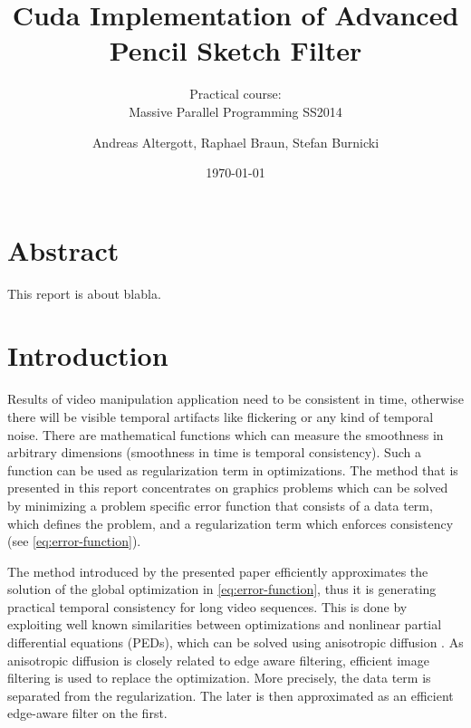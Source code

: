 \documentclass{utue} %
\title{Cuda Implementation of Advanced Pencil Sketch Filter}
\author{Andreas Altergott, Raphael Braun, Stefan Burnicki}
\date{\today}
\subtitle{Practical course:\\Massive Parallel Programming SS2014}
\begin{document}

\maketitle 
 
\section*{Abstract} 
This report is about blabla.

\section{Introduction}
Results of video manipulation application need to be consistent in time,
otherwise there will be visible temporal artifacts like flickering or any kind
of temporal noise. There are mathematical functions which can measure the
smoothness in arbitrary dimensions (smoothness in time is temporal consistency).
Such a function can be used as regularization term in optimizations. The method
that is presented in this report concentrates on graphics problems which can be
solved by minimizing a problem specific error function that consists of a data
term, which defines the problem, and a regularization term which enforces
consistency (see \autoref{eq:error-function}). 

The method introduced by the presented paper \cite{Lang:2012} efficiently
approximates the solution of the global optimization in
\autoref{eq:error-function}, thus it is generating practical temporal
consistency for long video sequences. This is done by exploiting well known
similarities between optimizations and nonlinear partial differential equations
(PEDs), which can be solved using anisotropic diffusion \cite{Weickert:1998}. As
anisotropic diffusion is closely related to edge aware filtering, efficient
image filtering is used to replace the optimization. More precisely, the data
term is separated from the regularization. The later is then approximated as an
efficient edge-aware filter on the first.
\end{document}
